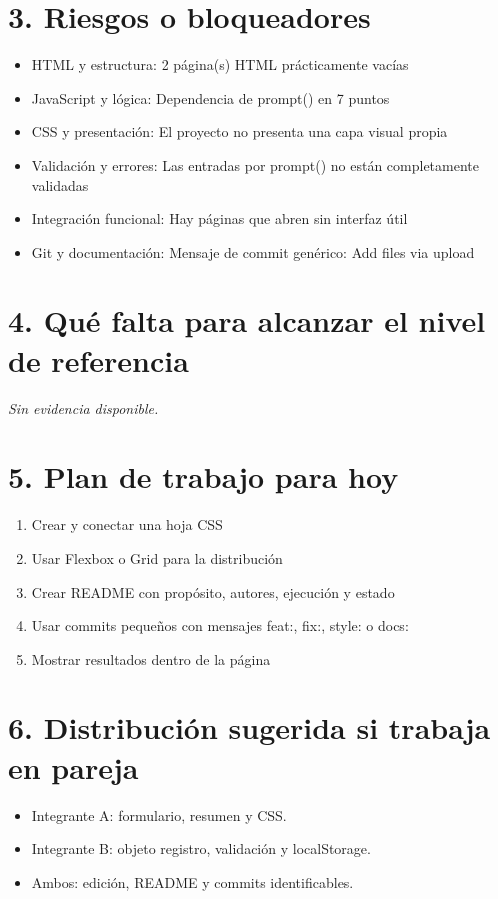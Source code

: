 \documentclass[10pt,a4paper]{article}
\begin{document}
\section*{3. Riesgos o bloqueadores}
\begin{itemize}
\item HTML y estructura: 2 página(s) HTML prácticamente vacías
\item JavaScript y lógica: Dependencia de prompt() en 7 puntos
\item CSS y presentación: El proyecto no presenta una capa visual propia
\item Validación y errores: Las entradas por prompt() no están completamente validadas
\item Integración funcional: Hay páginas que abren sin interfaz útil
\item Git y documentación: Mensaje de commit genérico: Add files via upload
\end{itemize}


\newpage
\section*{4. Qué falta para alcanzar el nivel de referencia}
\emph{Sin evidencia disponible.}
\section*{5. Plan de trabajo para hoy}
\begin{enumerate}
\item Crear y conectar una hoja CSS
\item Usar Flexbox o Grid para la distribución
\item Crear README con propósito, autores, ejecución y estado
\item Usar commits pequeños con mensajes feat:, fix:, style: o docs:
\item Mostrar resultados dentro de la página
\end{enumerate}
\section*{6. Distribución sugerida si trabaja en pareja}
\begin{itemize}
\item Integrante A: formulario, resumen y CSS.
\item Integrante B: objeto registro, validación y localStorage.
\item Ambos: edición, README y commits identificables.
\end{itemize}
\end{document}
